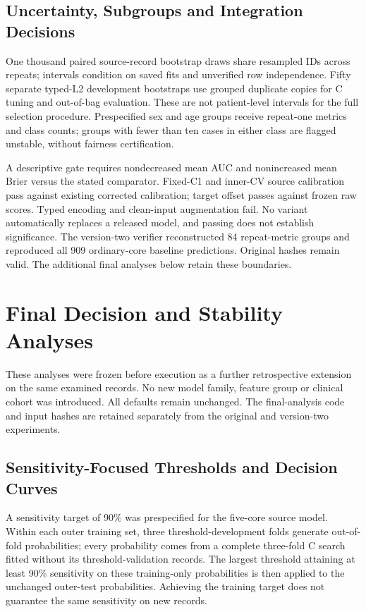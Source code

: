 \documentclass[conference,10pt]{IEEEtran}
\begin{document}
\subsection{Uncertainty, Subgroups and Integration Decisions}
One thousand paired source-record bootstrap draws share resampled IDs across repeats; intervals condition on saved fits and unverified row independence. Fifty separate typed-L2 development bootstraps use grouped duplicate copies for C tuning and out-of-bag evaluation. These are not patient-level intervals for the full selection procedure. Prespecified sex and age groups receive repeat-one metrics and class counts; groups with fewer than ten cases in either class are flagged unstable, without fairness certification.

A descriptive gate requires nondecreased mean AUC and nonincreased mean Brier versus the stated comparator. Fixed-C1 and inner-CV source calibration pass against existing corrected calibration; target offset passes against frozen raw scores. Typed encoding and clean-input augmentation fail. No variant automatically replaces a released model, and passing does not establish significance. The version-two verifier reconstructed 84 repeat-metric groups and reproduced all 909 ordinary-core baseline predictions. Original hashes remain valid. The additional final analyses below retain these boundaries.


\section{Final Decision and Stability Analyses}
These analyses were frozen before execution as a further retrospective extension on the same examined records. No new model family, feature group or clinical cohort was introduced. All defaults remain unchanged. The final-analysis code and input hashes are retained separately from the original and version-two experiments.

\subsection{Sensitivity-Focused Thresholds and Decision Curves}
A sensitivity target of 90\% was prespecified for the five-core source model. Within each outer training set, three threshold-development folds generate out-of-fold probabilities; every probability comes from a complete three-fold C search fitted without its threshold-validation records. The largest threshold attaining at least 90\% sensitivity on these training-only probabilities is then applied to the unchanged outer-test probabilities. Achieving the training target does not guarantee the same sensitivity on new records.
\end{document}
